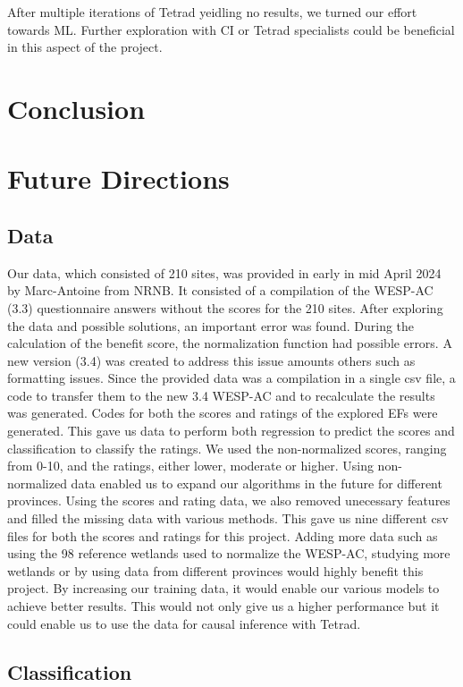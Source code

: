 \documentclass[12pt,letterpaper]{article}
\begin{document}
After multiple iterations of Tetrad yeidling no results, we turned our effort towards \ac{ML}.
Further exploration with \ac{CI} or Tetrad specialists could be beneficial in this aspect of the project.


\section{Conclusion}

\section{Future Directions}
\subsection{Data}
Our data, which consisted of 210 sites, was provided in early in mid April 2024 by Marc-Antoine from \ac{NRNB}.
It consisted of a compilation of the WESP-AC (3.3) questionnaire answers without the scores for the 210 sites.
After exploring the data and possible solutions, an important error was found.
During the calculation of the benefit score, the normalization function had possible errors.
A new version (3.4) was created to address this issue amounts others such as formatting issues.
Since the provided data was a compilation in a single csv file, a code to transfer them to the new 3.4 WESP-AC and to recalculate the results was generated.
Codes for both the scores and ratings of the explored \ac{EF}s were generated.
This gave us data to perform both regression to predict the scores and classification to classify the ratings.
We used the non-normalized scores, ranging from 0-10, and the ratings, either lower, moderate or higher.
Using non-normalized data enabled us to expand our algorithms in the future for different provinces.
Using the scores and rating data, we also removed unecessary features and filled the missing data with various methods.
This gave us nine different csv files for both the scores and ratings for this project.
Adding more data such as using the 98 reference wetlands used to normalize the WESP-AC, studying more wetlands or by using data from different provinces would highly benefit this project.
By increasing our training data, it would enable our various models to achieve better results.
This would not only give us a higher performance but it could enable us to use the data for causal inference with Tetrad.

\subsection{Classification}
\end{document}
